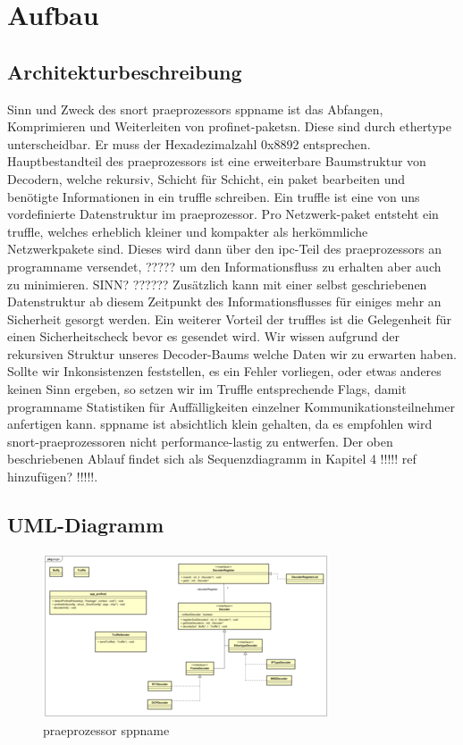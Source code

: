 \chapter{Aufbau \sppname}

\section{Architekturbeschreibung}

Sinn und Zweck des \gls{snort} \gls{praeprozessor}s \gls{sppname} ist das Abfangen,
Komprimieren und Weiterleiten von \gls{profinet}-\glspl{paket}n. Diese
sind durch \gls{ethertype} unterscheidbar. Er muss der Hexadezimalzahl 0x8892 entsprechen.
Hauptbestandteil des \gls{praeprozessor}s ist eine erweiterbare Baumstruktur von Decodern, welche rekursiv, Schicht für Schicht, ein \gls{paket} bearbeiten und benötigte Informationen in ein \gls{truffle} schreiben. Ein \gls{truffle} ist eine von uns vordefinierte Datenstruktur im \gls{praeprozessor}.
Pro Netzwerk-\gls{paket} entsteht ein \gls{truffle}, welches erheblich kleiner und kompakter als herkömmliche Netzwerkpakete sind. Dieses wird dann über den \gls{ipc}-Teil des \gls{praeprozessor}s
an \gls{programname} versendet, ????? um den Informationsfluss zu erhalten aber auch zu minimieren. SINN? ??????\newline
Zusätzlich kann mit einer selbst geschriebenen Datenstruktur ab diesem Zeitpunkt des Informationsflusses für einiges mehr an Sicherheit gesorgt werden.
Ein weiterer Vorteil der \glspl{truffle} ist die Gelegenheit für einen Sicherheitscheck bevor es gesendet wird. Wir wissen aufgrund der rekursiven Struktur unseres Decoder-Baums welche Daten wir zu erwarten haben. Sollte wir Inkonsistenzen feststellen, es ein Fehler vorliegen, oder etwas anderes keinen Sinn ergeben, so setzen wir im Truffle entsprechende Flags, damit \gls{programname} Statistiken für Auffälligkeiten einzelner Kommunikationsteilnehmer anfertigen kann.\newline
\gls{sppname} ist absichtlich klein gehalten, da es empfohlen wird \gls{snort}-\gls{praeprozessor}en nicht performance-lastig zu entwerfen. Der oben beschriebenen Ablauf findet sich als Sequenzdiagramm in Kapitel 4 !!!!! ref hinzufügen? !!!!!.


\section{UML-Diagramm}

\begin{figure}
  \centering
  \includegraphics[width=\paperwidth]{../diagramimages/spp_profinet.png}
  \caption{\gls{praeprozessor} \gls{sppname}}
\end{figure}
